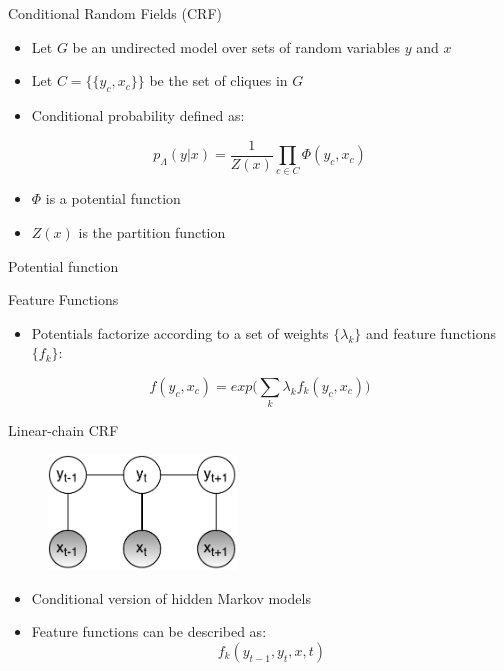 \documentclass[presentation,bigger]{beamer}
\begin{document}
\begin{frame}[label={sec:orgheadline6}]{Conditional Random Fields (CRF)}
\begin{definition}[CRF]
\begin{itemize}
\item Let \(G\) be an undirected model over sets of random variables \(y\) and \(x\)
\item Let \(C = \{\{y_c, x_c\}\}\) be the set of cliques in \(G\)
\item Conditional probability defined as:
\end{itemize}
\[ p_\Lambda(y|x) = \dfrac{1}{Z(x)}\prod_{c \in C} \Phi (y_c, x_c) \]
\begin{itemize}
\item \(\Phi\) is a potential function
\item \(Z(x)\) is the partition function
\end{itemize}
\end{definition}
\end{frame}
\begin{frame}[label={sec:orgheadline7}]{Potential function}
\begin{block}{Feature Functions}
\begin{itemize}
\item Potentials factorize according to a set of weights \(\{\lambda_k\}\) and feature functions \(\{f_k\}\):
\end{itemize}
\[ f(y_c,x_c) = exp\Bigg(\sum_k \lambda_kf_k(y_c,x_c)\Bigg) \]
\end{block}
\end{frame}
\begin{frame}[label={sec:orgheadline8}]{Linear-chain CRF}
\begin{figure}[htb]
\centering
\includegraphics[width=5cm]{figures/LCRF.pdf}
\end{figure}
\begin{itemize}
\item Conditional version of hidden Markov models
\item Feature functions can be described as:
\[ f_k(y_{t-1},y_t,x,t) \]
\end{itemize}
\end{frame}
\end{document}
